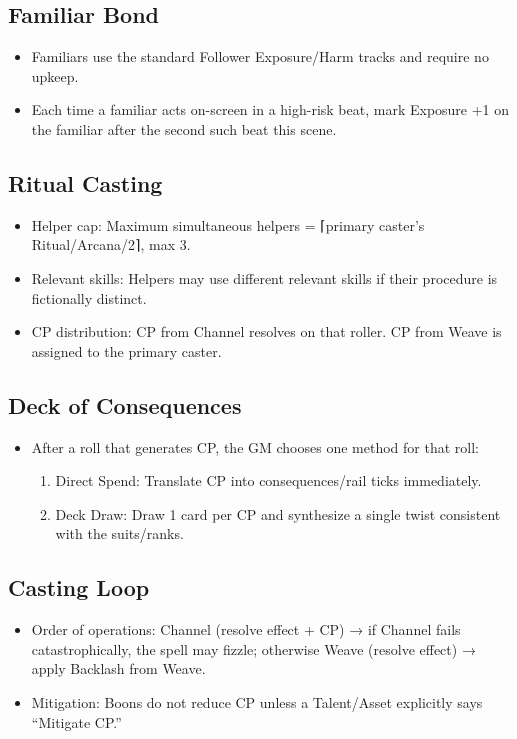 \documentclass[11pt]{article}
\begin{document}
\subsection{Familiar Bond}
\begin{itemize}
    \item Familiars use the standard Follower Exposure/Harm tracks and require no upkeep.
    \item Each time a familiar acts on-screen in a high-risk beat, mark Exposure +1 on the familiar after the second such beat this scene.
\end{itemize}

\subsection{Ritual Casting}
\begin{itemize}
    \item Helper cap: Maximum simultaneous helpers = ⌈primary caster's Ritual/Arcana/2⌉, max 3.
    \item Relevant skills: Helpers may use different relevant skills if their procedure is fictionally distinct.
    \item CP distribution: CP from Channel resolves on that roller. CP from Weave is assigned to the primary caster.
\end{itemize}

\subsection{Deck of Consequences}
\begin{itemize}
    \item After a roll that generates CP, the GM chooses one method for that roll:
    \begin{enumerate}
        \item Direct Spend: Translate CP into consequences/rail ticks immediately.
        \item Deck Draw: Draw 1 card per CP and synthesize a single twist consistent with the suits/ranks.
    \end{enumerate}
\end{itemize}

\subsection{Casting Loop}
\begin{itemize}
    \item Order of operations: Channel (resolve effect + CP) → if Channel fails catastrophically, the spell may fizzle; otherwise Weave (resolve effect) → apply Backlash from Weave.
    \item Mitigation: Boons do not reduce CP unless a Talent/Asset explicitly says “Mitigate CP.”
\end{itemize}
\end{document}
